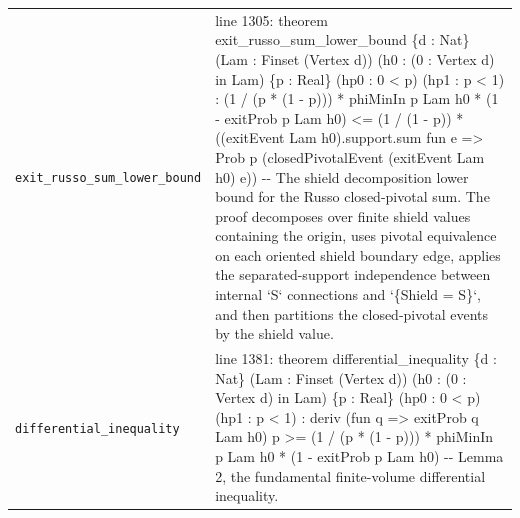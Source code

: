 \documentclass[10pt]{article}
\begin{document}
\begin{longtable}{>{\raggedright\arraybackslash}p{} >{\raggedright\arraybackslash}p{}}
\texttt{exit\_\allowbreak{}russo\_\allowbreak{}sum\_\allowbreak{}lower\_\allowbreak{}bound} & {\ttfamily\scriptsize line 1305:\allowbreak{} theorem exit\_\allowbreak{}russo\_\allowbreak{}sum\_\allowbreak{}lower\_\allowbreak{}bound \{d :\allowbreak{} Nat\} (\allowbreak{}Lam :\allowbreak{} Finset (\allowbreak{}Vertex d)\allowbreak{})\allowbreak{} (\allowbreak{}h0 :\allowbreak{} (\allowbreak{}0 :\allowbreak{} Vertex d)\allowbreak{} in Lam)\allowbreak{} \{p :\allowbreak{} Real\} (\allowbreak{}hp0 :\allowbreak{} 0 < p)\allowbreak{} (\allowbreak{}hp1 :\allowbreak{} p < 1)\allowbreak{} :\allowbreak{} (\allowbreak{}1 /\allowbreak{} (\allowbreak{}p *\allowbreak{} (\allowbreak{}1 -\allowbreak{} p)\allowbreak{})\allowbreak{})\allowbreak{} *\allowbreak{} phiMinIn p Lam h0 *\allowbreak{} (\allowbreak{}1 -\allowbreak{} exitProb p Lam h0)\allowbreak{} <=\allowbreak{} (\allowbreak{}1 /\allowbreak{} (\allowbreak{}1 -\allowbreak{} p)\allowbreak{})\allowbreak{} *\allowbreak{} (\allowbreak{}(\allowbreak{}exitEvent Lam h0)\allowbreak{}.\allowbreak{}support.\allowbreak{}sum fun e =\allowbreak{}> Prob p (\allowbreak{}closedPivotalEvent (\allowbreak{}exitEvent Lam h0)\allowbreak{} e)\allowbreak{})\allowbreak{} -\allowbreak{}-\allowbreak{} The shield decomposition lower bound for the Russo closed-\allowbreak{}pivotal sum.\allowbreak{} The proof decomposes over finite shield values containing the origin,\allowbreak{} uses pivotal equivalence on each oriented shield boundary edge,\allowbreak{} applies the separated-\allowbreak{}support independence between internal `S` connections and `\{Shield =\allowbreak{} S\}`,\allowbreak{} and then partitions the closed-\allowbreak{}pivotal events by the shield value.\allowbreak{}} \\[0.45em]
\texttt{differential\_\allowbreak{}inequality} & {\ttfamily\scriptsize line 1381:\allowbreak{} theorem differential\_\allowbreak{}inequality \{d :\allowbreak{} Nat\} (\allowbreak{}Lam :\allowbreak{} Finset (\allowbreak{}Vertex d)\allowbreak{})\allowbreak{} (\allowbreak{}h0 :\allowbreak{} (\allowbreak{}0 :\allowbreak{} Vertex d)\allowbreak{} in Lam)\allowbreak{} \{p :\allowbreak{} Real\} (\allowbreak{}hp0 :\allowbreak{} 0 < p)\allowbreak{} (\allowbreak{}hp1 :\allowbreak{} p < 1)\allowbreak{} :\allowbreak{} deriv (\allowbreak{}fun q =\allowbreak{}> exitProb q Lam h0)\allowbreak{} p >=\allowbreak{} (\allowbreak{}1 /\allowbreak{} (\allowbreak{}p *\allowbreak{} (\allowbreak{}1 -\allowbreak{} p)\allowbreak{})\allowbreak{})\allowbreak{} *\allowbreak{} phiMinIn p Lam h0 *\allowbreak{} (\allowbreak{}1 -\allowbreak{} exitProb p Lam h0)\allowbreak{} -\allowbreak{}-\allowbreak{} Lemma 2,\allowbreak{} the fundamental finite-\allowbreak{}volume differential inequality.\allowbreak{}} \\[0.45em]
\end{longtable}
\end{document}
